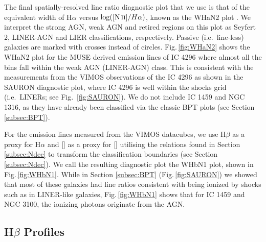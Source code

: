 		The final spatially-resolved line ratio diagnostic plot that we use is that of the equivalent width of H$\alpha$ versus $\log([\text{\ion{N}{ii}}]/H\alpha)$, known as the WHaN2 plot \citep{CidFernandes2011}. We interpret the strong AGN, weak AGN and retired regions on this plot as Seyfert 2, LINER-AGN and LIER classifications, respectively. Passive (i.e.\ line-less) galaxies are marked with crosses instead of circles. Fig.\,\ref{fig:WHaN2} shows the WHaN2 plot for the MUSE derived emission lines of IC 4296 where almost all the bins fall within the weak AGN (LINER-AGN) class. This is consistent with the measurements from the VIMOS observations of the IC 4296 as shown in the SAURON diagnostic plot, where IC 4296 is well within the shocks grid (i.e.\ LINERs; see Fig.\ \ref{fig:SAURON}). We do not include IC 1459 and NGC 1316, as they have already been classified via the classic BPT plots (see Section \ref{subsec:BPT}). 

		For the emission lines measured from the VIMOS datacubes, we use H$\beta$ as a proxy for H$\alpha$ and [] as a proxy for [] utilising the relations found in Section \ref{subsec:Ndec} to transform the classification boundaries (see Section \ref{subsec:Ndec}). We call the resulting diagnostic plot the WHbN1 plot, shown in Fig.\,\ref{fig:WHbN1}. While in Section \ref{subsec:BPT} (Fig.\,\ref{fig:SAURON}) we showed that most of these galaxies had line ratios consistent with being ionized by shocks such as in LINER-like galaxies, Fig.\,\ref{fig:WHbN1} shows that for IC 1459 and NGC 3100, the ionizing photons originate from the AGN. 


	\subsection{H$\beta$ Profiles}
		\label{subsec:Hb}

